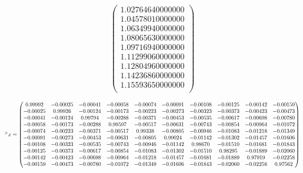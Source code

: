\documentclass[a4paper, 12pt]{extarticle}
\begin{document}
\begin{equation}
{\begin{pmatrix}
            1.02764640000000\\ 
            1.04578010000000\\ 
            1.06349940000000\\ 
            1.08065630000000\\ 
            1.09716940000000\\ 
            1.11299060000000\\ 
            1.12804960000000\\ 
            1.14236860000000\\ 
            1.15593650000000\\ 
        \end{pmatrix}
    }
\end{equation}

\begin{equation*}
    \scalemath{0.7}{
        {^>x} = \begin{pmatrix}
            0.99992 & -0.00025 & -0.00041 & -0.00058 & -0.00074 & -0.00091 & -0.00108 & -0.00125 & -0.00142 & -0.00159 \\ 
            -0.00025 & 0.99926 & -0.00124 & -0.00173 & -0.00223 & -0.00273 & -0.00323 & -0.00373 & -0.00423 & -0.00473 \\ 
            -0.00041 & -0.00124 & 0.99794 & -0.00288 & -0.00371 & -0.00453 & -0.00535 & -0.00617 & -0.00698 & -0.00780 \\ 
            -0.00058 & -0.00173 & -0.00288 & 0.99597 & -0.00517 & -0.00631 & -0.00743 & -0.00854 & -0.00964 & -0.01072 \\ 
            -0.00074 & -0.00223 & -0.00371 & -0.00517 & 0.99338 & -0.00805 & -0.00946 & -0.01083 & -0.01218 & -0.01349 \\ 
            -0.00091 & -0.00273 & -0.00453 & -0.00631 & -0.00805 & 0.99024 & -0.01142 & -0.01302 & -0.01457 & -0.01606 \\ 
            -0.00108 & -0.00323 & -0.00535 & -0.00743 & -0.00946 & -0.01142 & 0.98670 & -0.01510 & -0.01681 & -0.01843 \\ 
            -0.00125 & -0.00373 & -0.00617 & -0.00854 & -0.01083 & -0.01302 & -0.01510 & 0.98295 & -0.01889 & -0.02060 \\ 
            -0.00142 & -0.00423 & -0.00698 & -0.00964 & -0.01218 & -0.01457 & -0.01681 & -0.01889 & 0.97919 & -0.02258 \\ 
            -0.00159 & -0.00473 & -0.00780 & -0.01072 & -0.01349 & -0.01606 & -0.01843 & -0.02060 & -0.02258 & 0.97562 
        \end{pmatrix}
}
\end{equation*}
\end{document}
